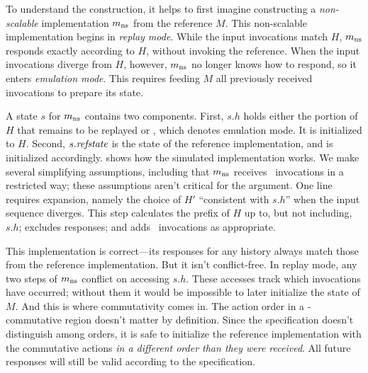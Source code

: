 
To understand the construction, it helps to first imagine constructing a
\emph{non-scalable} implementation $m_{\text{ns}}$ from the reference $M$.
%
This non-scalable implementation begins in \emph{replay mode}.
%
While the input invocations match $H$, $m_{\text{ns}}$ responds exactly according to
$H$, without invoking the reference.
%
When the input invocations diverge from $H$, however, $m_{\text{ns}}$ no
longer knows how to respond, so it enters \emph{emulation mode}.
%
This requires feeding $M$ all previously received invocations to
prepare its state.

A state $s$ for $m_{\text{ns}}$ contains two components.
%
First, $s.h$ holds either the portion of $H$ that remains to be replayed
or \EMULATE, which denotes emulation mode.
It is initialized to $H$.
%
Second, $s.\textit{refstate}$ is the state of the reference
implementation, and is initialized accordingly.
%
 shows how the simulated implementation
works.
%
We make several simplifying assumptions, including that $m_{\text{ns}}$
receives \CONTINUE\ invocations in a restricted way; these assumptions aren't
critical for the argument.
%
One line requires expansion, namely the choice of $H'$ ``consistent
with \(s.h\)'' when the input sequence diverges.
%
This step calculates the prefix of $H$ up to, but not including, $s.h$;
excludes responses; and adds \CONTINUE\ invocations as appropriate.

This implementation is correct---its responses for any history
always match those from the reference implementation.
%
But it isn't conflict-free.
%
In replay mode, any two steps of $m_{\text{ns}}$ conflict on accessing
$s.h$. These accesses track which invocations
have occurred; without them it would be impossible to later
initialize the state of $M$.
%
And this is where commutativity comes in.
%
The action order in a \SIM-commutative region doesn't matter by
definition.
%
Since the specification doesn't distinguish among orders, it
is safe to initialize the reference implementation with the commutative
actions \emph{in a different order than they were received}.
%
All future responses will still be valid according to the specification.

